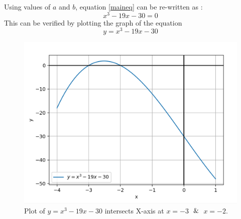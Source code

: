 \documentclass[journal,12pt,twocolumn]{IEEEtran}
\begin{document}
    Using values of $a$ and $b$, equation \eqref{maineq} can be re-written as :
    \begin{equation}
    \label{Peq}
        x^3-19x-30=0
    \end{equation}
    This can be verified by plotting the graph of the equation
    \begin{equation}
    \label{grapheq}
        y=x^3-19x-30
    \end{equation}
    
\begin{figure}[h!]
    \includegraphics[width=\columnwidth]{figs/graph.png}
    \caption{Plot of $y=x^3-19x-30$ intersects X-axis at $x=-3$ $\And$ $x=-2$. }
    \label{graph}

\end{figure}
\end{document}

